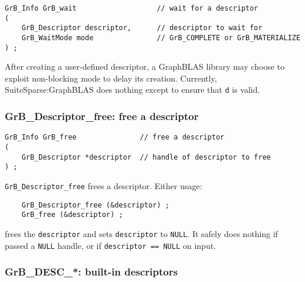 \documentclass[12pt]{article}
\begin{document}
\begin{mdframed}[userdefinedwidth=6in]
{\footnotesize
\begin{verbatim}
GrB_Info GrB_wait                   // wait for a descriptor
(
    GrB_Descriptor descriptor,      // descriptor to wait for
    GrB_WaitMode mode               // GrB_COMPLETE or GrB_MATERIALIZE
) ;
\end{verbatim}
}\end{mdframed}

After creating a user-defined descriptor, a GraphBLAS library may choose to
exploit non-blocking mode to delay its creation.  Currently,
SuiteSparse:GraphBLAS does nothing except to ensure that \verb'd' is valid.

\subsubsection{{\sf GrB\_Descriptor\_free:} free a descriptor}
\label{descriptor_free}

\begin{mdframed}[userdefinedwidth=6in]
{\footnotesize
\begin{verbatim}
GrB_Info GrB_free               // free a descriptor
(
    GrB_Descriptor *descriptor  // handle of descriptor to free
) ;
\end{verbatim} } \end{mdframed}

\verb'GrB_Descriptor_free' frees a descriptor.
Either usage:

    {\small
    \begin{verbatim}
    GrB_Descriptor_free (&descriptor) ;
    GrB_free (&descriptor) ; \end{verbatim}}

\noindent
frees the \verb'descriptor' and sets \verb'descriptor' to \verb'NULL'.  It
safely does nothing if passed a \verb'NULL' handle, or if
\verb'descriptor == NULL' on input.

\newpage
\subsubsection{{\sf GrB\_DESC\_*:}  built-in descriptors}
\label{descriptor_predefined}
\end{document}
